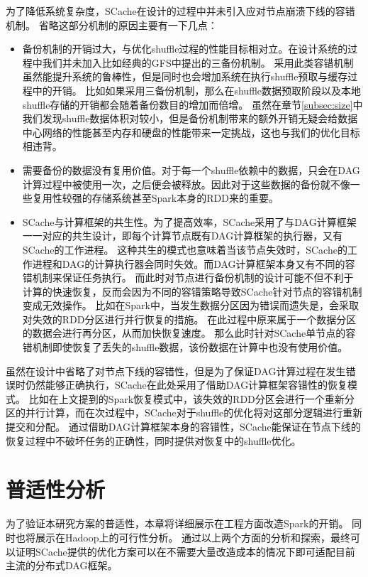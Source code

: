 为了降低系统复杂度，SCache在设计的过程中并未引入应对节点崩溃下线的容错机制。
省略这部分机制的原因主要有一下几点：
\begin{itemize}
    \item 备份机制的开销过大，与优化shuffle过程的性能目标相对立。在设计系统的过程中我们并未加入比如经典的GFS\cite{gfs}中提出的三备份机制。
    采用此类容错机制虽然能提升系统的鲁棒性，但是同时也会增加系统在执行shuffle预取与缓存过程中的开销。
    比如如果采用三备份机制，那么在shuffle数据预取阶段以及本地shuffle存储的开销都会随着备份数目的增加而倍增。
    虽然在章节\ref{subsec:size}中我们发现shuffle数据体积对较小，但是备份机制带来的额外开销无疑会给数据中心网络的性能甚至内存和硬盘的性能带来一定挑战，这也与我们的优化目标相违背。
    \item 需要备份的数据没有复用价值。对于每一个shuffle依赖中的数据，只会在DAG计算过程中被使用一次，之后便会被释放。因此对于这些数据的备份就不像一些复用性较强的存储系统甚至Spark本身的RDD来的重要。
    \item SCache与计算框架的共生性。为了提高效率，SCache采用了与DAG计算框架一一对应的共生设计，即每个计算节点既有DAG计算框架的执行器，又有SCache的工作进程。
    这种共生的模式也意味着当该节点失效时，SCache的工作进程和DAG的计算执行器会同时失效。而DAG计算框架本身又有不同的容错机制来保证任务执行。
    而此时对节点进行备份机制的设计可能不但不利于计算的快速恢复，反而会因为不同的容错策略导致SCache针对节点的容错机制变成无效操作。
    比如在Spark中，当发生数据分区因为错误而遗失是，会采取对失效的RDD分区进行并行恢复的措施。
    在此过程中原来属于一个数据分区的数据会进行再分区，从而加快恢复速度。
    那么此时针对SCache单节点的容错机制即使恢复了丢失的shuffle数据，该份数据在计算中也没有使用价值。
\end{itemize}

虽然在设计中省略了对节点下线的容错性，但是为了保证DAG计算过程在发生错误时仍然能够正确执行，SCache在此处采用了借助DAG计算框架容错性的恢复模式。
比如在上文提到的Spark恢复模式中，该失效的RDD分区会进行一个重新分区的并行计算，而在次过程中，SCache对于shuffle的优化将对这部分逻辑进行重新提交和分配。
通过借助DAG计算框架本身的容错性，SCache能保证在节点下线的恢复过程中不破坏任务的正确性，同时提供对恢复中的shuffle优化。

\section{普适性分析}
\label{sec:impl}

为了验证本研究方案的普适性，本章将详细展示在工程方面改造Spark的开销。
同时也将展示在Hadoop上的可行性分析。
通过以上两个方面的分析和探索，最终可以证明SCache提供的优化方案可以在不需要大量改造成本的情况下即可适配目前主流的分布式DAG框架。

